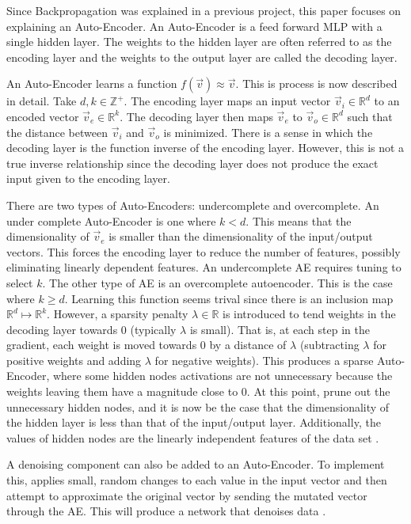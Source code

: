 \documentclass[twoside,11pt]{article}
\begin{document}
	Since Backpropagation was explained in a previous project, this paper focuses on explaining an Auto-Encoder. 
	An Auto-Encoder is a feed forward MLP with a single hidden layer. 
	The weights to the hidden layer are often referred to as the encoding layer and the weights to the output layer are called the decoding layer. 
	
	An Auto-Encoder learns a function $f(\vec{v}) \approx \vec{v}$. 
	This is process is now described in detail.
	Take $d,k \in \mathbb{Z}^+$. 
	The encoding layer maps an input vector $\vec{v}_i \in \mathbb{R}^d$ to an encoded vector $\vec{v}_e \in \mathbb{R}^k$.
	The decoding layer then maps $\vec{v}_e$ to $\vec{v}_o \in \mathbb{R}^d$ such that the distance between $\vec{v}_i$ and $\vec{v}_o$ is minimized.
	There is a sense in which the decoding layer is the function inverse of the encoding layer. 
	However, this is not a true inverse relationship since the decoding layer does not produce the exact input given to the encoding layer.
	
	There are two types of Auto-Encoders: undercomplete and overcomplete. 
	An under complete Auto-Encoder is one where $k < d$. This means that the dimensionality of $\vec{v}_e$ is smaller than the dimensionality of the input/output vectors. 
	This forces the encoding layer to reduce the number of features, possibly eliminating linearly dependent features. 
	An undercomplete AE requires tuning to select $k$.
	The other type of AE is an overcomplete autoencoder. This is the case where $k \geq d$.
	Learning this function seems trival since there is an inclusion map $\mathbb{R}^d \mapsto \mathbb{R}^k$.
	However, a sparsity penalty $\lambda \in \mathbb{R}$ is introduced to tend weights in the decoding layer towards 0 (typically $\lambda$ is small).
	That is, at each step in the gradient, each weight is moved towards 0 by a distance of $\lambda$ (subtracting $\lambda$ for positive weights and adding $\lambda$ for negative weights).
	This produces a sparse Auto-Encoder, where some hidden nodes activations are not unnecessary because the weights leaving them have a magnitude close to 0.
	At this point, prune out the unnecessary hidden nodes, and it is now be the case that the dimensionality of the hidden layer is less than that of the input/output layer.
	Additionally, the values of hidden nodes are the linearly independent features of the data set \citep{sparsity}.
	
	A denoising component can also be added to an Auto-Encoder. To implement this, applies small, random changes to each value in the input vector and then attempt to approximate the original vector by sending the mutated vector through the AE. This will produce a network that denoises data \citep{stacked-ae}.
	
\end{document}
